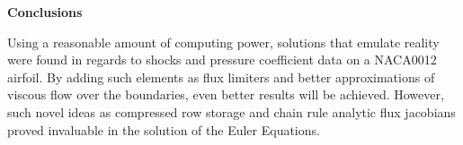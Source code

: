 \documentclass[letterpaper,twoside,11pt,openright,pdf]{book} %
\begin{document}
\begin{center}
\textbf{Conclusions}
\end{center}

Using a reasonable amount of computing power, solutions that emulate reality were found in regards to shocks and pressure coefficient data on a NACA0012 airfoil.  By adding such elements as flux limiters and better approximations of viscous flow over the boundaries, even better results will be achieved.  However, such novel ideas as compressed row storage and chain rule analytic flux jacobians proved invaluable in the solution of the Euler Equations.
 


\end{document}
